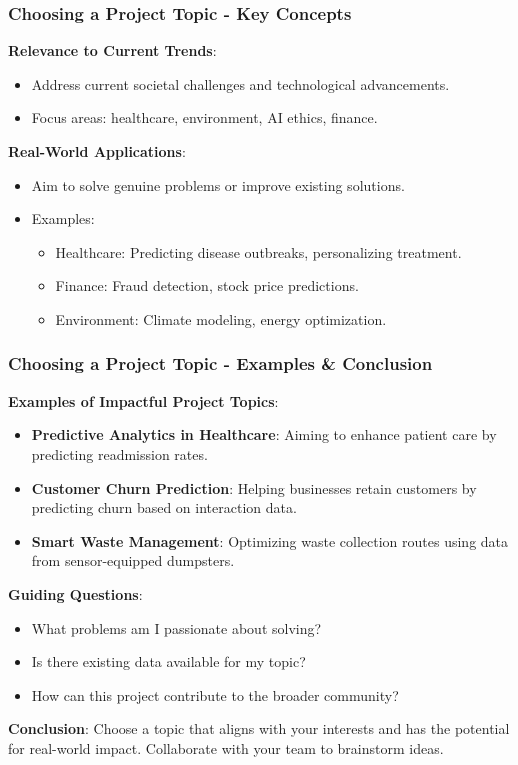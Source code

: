 \documentclass[aspectratio=169]{beamer}
\begin{document}
\begin{frame}[fragile]
    \frametitle{Choosing a Project Topic - Key Concepts}
    \textbf{Relevance to Current Trends}:
    \begin{itemize}
        \item Address current societal challenges and technological advancements.
        \item Focus areas: healthcare, environment, AI ethics, finance.
    \end{itemize}
    
    \textbf{Real-World Applications}:
    \begin{itemize}
        \item Aim to solve genuine problems or improve existing solutions.
        \item Examples:
        \begin{itemize}
            \item Healthcare: Predicting disease outbreaks, personalizing treatment.
            \item Finance: Fraud detection, stock price predictions.
            \item Environment: Climate modeling, energy optimization.
        \end{itemize}
    \end{itemize}
\end{frame}

\begin{frame}[fragile]
    \frametitle{Choosing a Project Topic - Examples & Conclusion}
    \textbf{Examples of Impactful Project Topics}:
    \begin{itemize}
        \item \textbf{Predictive Analytics in Healthcare}: Aiming to enhance patient care by predicting readmission rates.
        \item \textbf{Customer Churn Prediction}: Helping businesses retain customers by predicting churn based on interaction data.
        \item \textbf{Smart Waste Management}: Optimizing waste collection routes using data from sensor-equipped dumpsters.
    \end{itemize}

    \textbf{Guiding Questions}:
    \begin{itemize}
        \item What problems am I passionate about solving?
        \item Is there existing data available for my topic?
        \item How can this project contribute to the broader community?
    \end{itemize}

    \textbf{Conclusion}: 
    Choose a topic that aligns with your interests and has the potential for real-world impact. Collaborate with your team to brainstorm ideas.
\end{frame}
\end{document}
